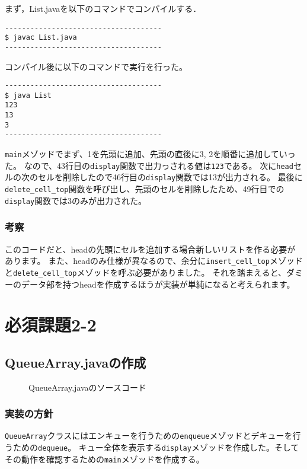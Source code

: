 \documentclass[10.5pt,a4paper]{jsarticle}
\begin{document}
まず，List.javaを以下のコマンドでコンパイルする．
\begin{verbatim}
-------------------------------------
$ javac List.java
-------------------------------------
\end{verbatim}
コンパイル後に以下のコマンドで実行を行った。
\begin{verbatim}
-------------------------------------
$ java List
123
13
3
-------------------------------------
\end{verbatim}

\texttt{main}メゾッドでまず、1を先頭に追加、先頭の直後に3, 2を順番に追加していった。
なので、43行目の\texttt{display}関数で出力っされる値は\texttt{123}である。
次に\texttt{head}セルの次のセルを削除したので46行目の\texttt{display}関数では13が出力される。
最後に\texttt{delete\_cell\_top}関数を呼び出し、先頭のセルを削除したため、49行目での\texttt{display}関数では3のみが出力された。

\subsubsection{考察}

このコードだと、headの先頭にセルを追加する場合新しいリストを作る必要があります。
また、headのみ仕様が異なるので、余分に\texttt{insert\_cell\_top}メゾッドと\texttt{delete\_cell\_top}メゾッドを呼ぶ必要がありました。
それを踏まえると、ダミーのデータ部を持つheadを作成するほうが実装が単純になると考えられます。

\section{必須課題2-2}

\subsection{QueueArray.javaの作成}

\begin{figure}[t]
  \begin{center}
   
   \caption{QueueArray.javaのソースコード}
   \label{code:QueueArray}
  \end{center}
 \end{figure}

\subsubsection{実装の方針}\label{sec:bs_impl_policy}
\texttt{QueueArray}クラスにはエンキューを行うための\texttt{enqueue}メゾッドとデキューを行うための\texttt{dequeue}。
キュー全体を表示する\texttt{display}メゾッドを作成した。そしてその動作を確認するための\texttt{main}メゾッドを作成する。
\end{document}
